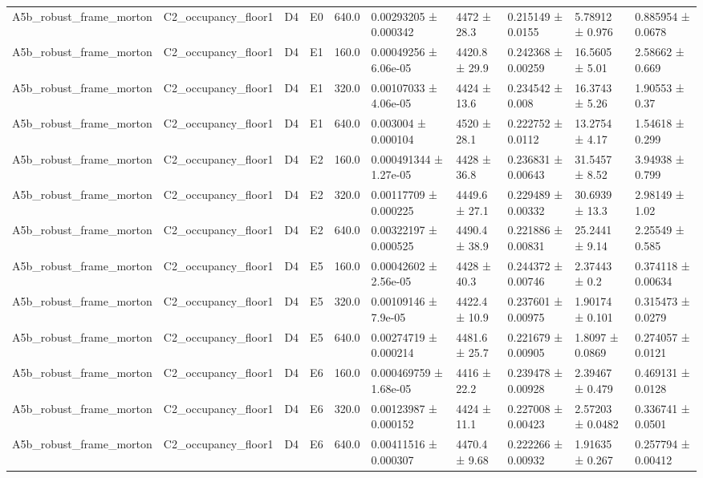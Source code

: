 \begin{table}
\begin{tabular}{llllllllll}
A5b\_robust\_frame\_morton & C2\_occupancy\_floor1 & D4 & E0 & 640.0 & 0.00293205 ± 0.000342 & 4472 ± 28.3 & 0.215149 ± 0.0155 & 5.78912 ± 0.976 & 0.885954 ± 0.0678 \\
A5b\_robust\_frame\_morton & C2\_occupancy\_floor1 & D4 & E1 & 160.0 & 0.00049256 ± 6.06e-05 & 4420.8 ± 29.9 & 0.242368 ± 0.00259 & 16.5605 ± 5.01 & 2.58662 ± 0.669 \\
A5b\_robust\_frame\_morton & C2\_occupancy\_floor1 & D4 & E1 & 320.0 & 0.00107033 ± 4.06e-05 & 4424 ± 13.6 & 0.234542 ± 0.008 & 16.3743 ± 5.26 & 1.90553 ± 0.37 \\
A5b\_robust\_frame\_morton & C2\_occupancy\_floor1 & D4 & E1 & 640.0 & 0.003004 ± 0.000104 & 4520 ± 28.1 & 0.222752 ± 0.0112 & 13.2754 ± 4.17 & 1.54618 ± 0.299 \\
A5b\_robust\_frame\_morton & C2\_occupancy\_floor1 & D4 & E2 & 160.0 & 0.000491344 ± 1.27e-05 & 4428 ± 36.8 & 0.236831 ± 0.00643 & 31.5457 ± 8.52 & 3.94938 ± 0.799 \\
A5b\_robust\_frame\_morton & C2\_occupancy\_floor1 & D4 & E2 & 320.0 & 0.00117709 ± 0.000225 & 4449.6 ± 27.1 & 0.229489 ± 0.00332 & 30.6939 ± 13.3 & 2.98149 ± 1.02 \\
A5b\_robust\_frame\_morton & C2\_occupancy\_floor1 & D4 & E2 & 640.0 & 0.00322197 ± 0.000525 & 4490.4 ± 38.9 & 0.221886 ± 0.00831 & 25.2441 ± 9.14 & 2.25549 ± 0.585 \\
A5b\_robust\_frame\_morton & C2\_occupancy\_floor1 & D4 & E5 & 160.0 & 0.00042602 ± 2.56e-05 & 4428 ± 40.3 & 0.244372 ± 0.00746 & 2.37443 ± 0.2 & 0.374118 ± 0.00634 \\
A5b\_robust\_frame\_morton & C2\_occupancy\_floor1 & D4 & E5 & 320.0 & 0.00109146 ± 7.9e-05 & 4422.4 ± 10.9 & 0.237601 ± 0.00975 & 1.90174 ± 0.101 & 0.315473 ± 0.0279 \\
A5b\_robust\_frame\_morton & C2\_occupancy\_floor1 & D4 & E5 & 640.0 & 0.00274719 ± 0.000214 & 4481.6 ± 25.7 & 0.221679 ± 0.00905 & 1.8097 ± 0.0869 & 0.274057 ± 0.0121 \\
A5b\_robust\_frame\_morton & C2\_occupancy\_floor1 & D4 & E6 & 160.0 & 0.000469759 ± 1.68e-05 & 4416 ± 22.2 & 0.239478 ± 0.00928 & 2.39467 ± 0.479 & 0.469131 ± 0.0128 \\
A5b\_robust\_frame\_morton & C2\_occupancy\_floor1 & D4 & E6 & 320.0 & 0.00123987 ± 0.000152 & 4424 ± 11.1 & 0.227008 ± 0.00423 & 2.57203 ± 0.0482 & 0.336741 ± 0.0501 \\
A5b\_robust\_frame\_morton & C2\_occupancy\_floor1 & D4 & E6 & 640.0 & 0.00411516 ± 0.000307 & 4470.4 ± 9.68 & 0.222266 ± 0.00932 & 1.91635 ± 0.267 & 0.257794 ± 0.00412 \\

\end{tabular}
\end{table}

